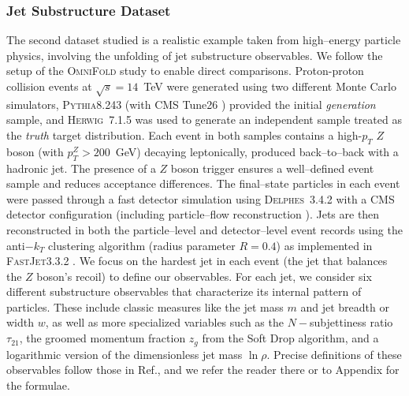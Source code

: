 {{        \subsubsection{Jet Substructure Dataset}
            The second dataset studied is a realistic example taken from high--energy particle physics, involving the unfolding of jet substructure observables.
            We follow the setup of the \textsc{OmniFold} study  to enable direct comparisons.
            Proton-proton collision events at $\sqrt{s}=14$~TeV were generated using two different Monte Carlo simulators, \textsc{Pythia}8.243  (with CMS Tune26 ) provided the initial \emph{generation} sample, and \textsc{Herwig}~7.1.5  was used to generate an independent sample treated as the \emph{truth} target distribution.
            Each event in both samples contains a high-$p_T$ $Z$ boson (with $p_T^Z > 200$~GeV) decaying leptonically, produced back--to--back with a hadronic jet.
            The presence of a $Z$ boson trigger ensures a well--defined event sample and reduces acceptance differences.
            The final--state particles in each event were passed through a fast detector simulation using \textsc{Delphes}~3.4.2  with a CMS detector configuration (including particle--flow reconstruction ).
            Jets are then reconstructed in both the particle--level and detector--level event records using the anti$-k_T$ clustering algorithm  (radius parameter $R=0.4$) as implemented in \textsc{FastJet}3.3.2 .
            We focus on the hardest jet in each event (the jet that balances the $Z$ boson’s recoil) to define our observables.
            For each jet, we consider six different substructure observables that characterize its internal pattern of particles.
            These include classic measures like the jet mass $m$ and jet breadth or width $w$, as well as more specialized variables such as the \(N-\)subjettiness ratio $\tau_{21}$, the groomed momentum fraction $z_g$ from the Soft Drop algorithm, and a logarithmic version of the dimensionless jet mass $\ln\rho$.
            Precise definitions of these observables follow those in Ref., and we refer the reader there or to Appendix  for the formulae.
}}
